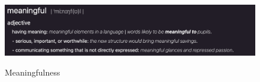 
\begin{figure}[H]
\includegraphics[width=12.5cm]{pictures/background/meaningful.png}
\caption{Meaningfulness}{\autocite{Oxford_dictionary}}
\centering
\end{figure}

